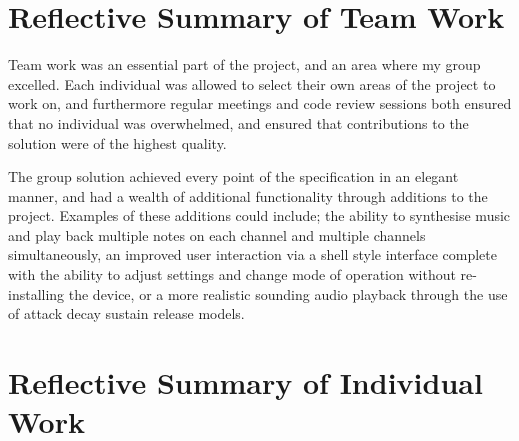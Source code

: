 \section{Reflective Summary of Team Work}

Team work was an essential part of the project, and an area where my group 
excelled. Each individual was allowed to select their own areas of the project 
to work on, and furthermore regular meetings and code review sessions both ensured 
that no individual was overwhelmed, and ensured that contributions to the 
solution were of the highest quality. 
\par\bigskip\noindent
The group solution achieved every point of the specification in an elegant 
manner, and had a wealth of additional functionality through additions to the 
project. 
Examples of these additions could include; the ability to synthesise music and 
play back multiple notes on each channel and multiple channels simultaneously, 
an improved user interaction via a shell style interface complete with the 
ability to adjust settings and change mode of operation without re-installing the 
device, or a more realistic sounding audio playback through the use of attack
decay sustain release models. 

\section{Reflective Summary of Individual Work}

